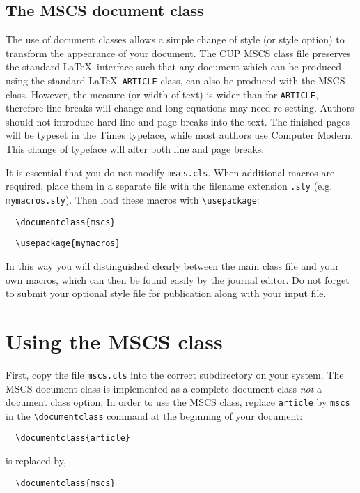 \documentclass{mscs}
\begin{document}
\subsection{The MSCS document class}

The use of document classes allows a simple change of style (or
style option) to transform the appearance of your document.
The CUP MSCS class file preserves the standard \LaTeX\ interface
such that any document which can be  produced using the standard
\LaTeX\ \verb"ARTICLE" class, can also be produced with the MSCS class.
However, the measure (or width of text) is wider than for \verb"ARTICLE",
therefore line breaks will change and long equations may need re-setting.
Authors should not introduce hard line and page breaks into the
text. The finished pages will be typeset in the Times typeface, while
most authors use Computer Modern. This change of typeface will alter both
line and page breaks.

It is essential that you do not modify \verb"mscs.cls". When
additional macros are required, place them in a separate file with
the filename extension \verb".sty" (e.g. \verb"mymacros.sty").
Then load these macros with \verb"\usepackage":
\begin{verbatim}
  \documentclass{mscs}
\end{verbatim}
\begin{verbatim}
  \usepackage{mymacros}
\end{verbatim}
In this way you will distinguished clearly between the main class file
and your own macros, which can then be found easily by the journal editor.
Do not forget to submit your optional style file for publication along
with your input file.

\section{Using the MSCS class}

First, copy the file \verb"mscs.cls" into the correct subdirectory on your
system. The MSCS document class is implemented as a complete document
class \emph{not} a document class option.
In order to use the MSCS class, replace \verb"article" by \verb"mscs" in
the \verb"\documentclass" command at the beginning of your document:
\begin{verbatim}
  \documentclass{article}
\end{verbatim}
is replaced by,
\begin{verbatim}
  \documentclass{mscs}
\end{verbatim}
\end{document}
